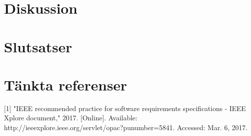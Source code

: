 
\section{Diskussion}
\label{sec:discussion-jannering}


\section{Slutsatser}
\label{sec:conclusions-jannering}


\section{Tänkta referenser}
[1]  "IEEE recommended practice for software requirements specifications - IEEE Xplore document," 2017. [Online]. Available: http://ieeexplore.ieee.org/servlet/opac?punumber=5841. Accessed: Mar. 6, 2017.

